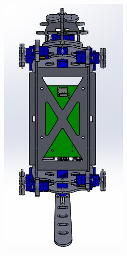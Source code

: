 \documentclass[runningheads,a4paper,12pt]{report}
\begin{document}
\begin{figure}[H]
\begin{subfigure}{.2\textwidth}
  		\caption{}
  		\label{fig:3_top}
  	\end{subfigure}
  	\hfill  
  	\begin{subfigure}{.25\textwidth}
  		\centering
  		\includegraphics[width=\linewidth]{./images/3_hard_down}
  		\caption{}
  		\label{fig:3_bottom}
  	\end{subfigure}
  	

\end{figure}
\end{document}
